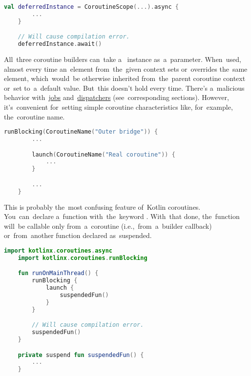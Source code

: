 \begin{lstlisting}[language=Kotlin]
    val deferredInstance = CoroutineScope(...).async {
        ...
    }

    // Will cause compilation error.
    deferredInstance.await()
\end{lstlisting}

\warning All~three coroutine builders can~take a~ instance as~a~parameter.
When~used, almost every time an~element from~the~given context sets or~overrides the~same element, which~would~be otherwise inherited from~the~parent coroutine context or~set to~a~default value.
But~this doesn't hold every time.
There's a~malicious behavior with~\hyperref[kotlincoroutinejob]{jobs} and~\hyperref[kotlincoroutinedispatcher]{dispatchers} (see~corresponding sections).
However, it's~convenient for~setting simple coroutine characteristics like, for~example, the~coroutine name.

\begin{lstlisting}[language=Kotlin]
    runBlocking(CoroutineName("Outer bridge")) {
        ...

        launch(CoroutineName("Real coroutine")) {
            ...
        }

        ...
    }
\end{lstlisting}

\label{kotlinsuspendfunction}
This is probably the~most confusing feature of~Kotlin coroutines.
You~can~declare a~function with~the~keyword .
With~that done, the~function will~be callable only from~a~coroutine (i.e.,~from~a~builder callback) or~from~another function declared as~suspended.

\begin{lstlisting}[language=Kotlin]
    import kotlinx.coroutines.async
    import kotlinx.coroutines.runBlocking

    fun runOnMainThread() {
        runBlocking {
            launch {
                suspendedFun()
            }
        }

        // Will cause compilation error.
        suspendedFun()
    }

    private suspend fun suspendedFun() {
        ...
    }
\end{lstlisting}
\newline

